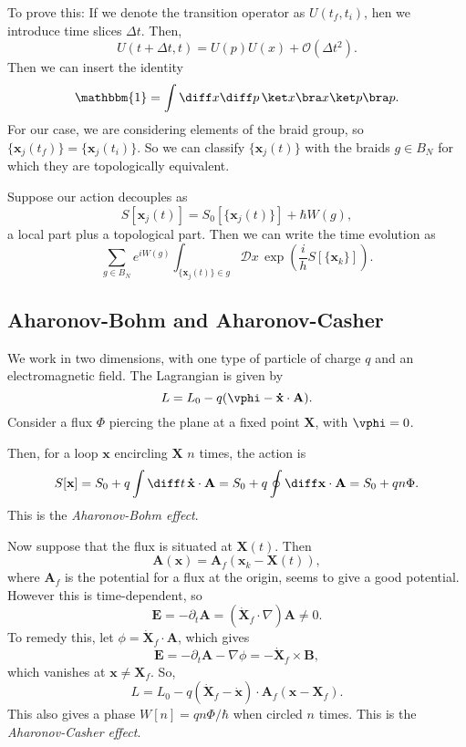 \documentclass[12pt]{article}
\begin{document}
To prove this: If we denote the transition operator as $U(t_f, t_i)$, hen we introduce time slices $\Delta t$. Then,
\[
U(t + \Delta t, t) = U(p)U(x) + \mathcal{O}(\Delta t^2).
\]
Then we can insert the identity
\[
\mathbbm{1} = \int \diff x \diff p \, \ket x \bra x \ket p \bra p.
\]
For our case, we are considering elements of the braid group, so $\{\mathbf{x}_j(t_f)\} = \{\mathbf{x}_j(t_i)\}$. So we can classify $\{\mathbf{x}_j(t)\}$ with the braids $g \in B_N$ for which they are topologically equivalent.

Suppose our action decouples as
\[
	S[\mathbf{x}_j(t)] = S_0[\{\mathbf{x}_j(t)\}] + \hbar W(g),
\]
a local part plus a topological part. Then we can write the time evolution as
\[
	\sum_{g \in B_N} e^{i W(g)} \int_{\{\mathbf{x}_j(t)\} \in g} \mathcal{D} x \, \exp \left( \frac ih S[\{\mathbf{x}_k\}] \right).
\]
\subsection{Aharonov-Bohm and Aharonov-Casher}%
\label{sub:acab}

We work in two dimensions, with one type of particle of charge $q$ and an electromagnetic field. The Lagrangian is given by
\[
L = L_0 - q(\vphi - \mathbf{\dot x} \cdot \mathbf{A}).
\]
Consider a flux $\Phi$ piercing the plane at a fixed point $\mathbf{X}$, with $\vphi = 0$.

Then, for a loop $\mathbf{x}$ encircling $\mathbf{X}$ $n$ times, the action is
\[
	S[\mathbf{x}] = S_0 + q \int \diff t\, \mathbf{\dot x} \cdot \mathbf{A} = S_0 + q \oint \diff \mathbf{x} \cdot \mathbf{A} = S_0 + q n \Phi.
\]
This is the \emph{Aharonov-Bohm effect}.

Now suppose that the flux is situated at $\mathbf{X}(t)$. Then
\[
\mathbf{A}(\mathbf{x}) = \mathbf{A}_f(\mathbf{x}_k - \mathbf{X}(t)),
\]
where $\mathbf{A}_f$ is the potential for a flux at the origin, seems to give a good potential. However this is time-dependent, so
\[
\mathbf{E} = - \partial_t \mathbf{A} = (\mathbf{\dot X}_f \cdot \nabla)\mathbf{A} \neq 0.
\]
To remedy this, let $\phi = \mathbf{\dot X}_f \cdot \mathbf{A}$, which gives
\[
\mathbf{E} = - \partial_t \mathbf{A} - \nabla \phi = - \mathbf{\dot X}_f \times \mathbf{B},
\]
which vanishes at $\mathbf{x} \neq \mathbf{X}_f$. So,
\[
L = L_0 - q (\mathbf{\dot X}_f - \mathbf{\dot x}) \cdot \mathbf{A}_f(\mathbf{x} - \mathbf{X}_f).
\]
This also gives a phase $W[n] = q n \Phi/\hbar$ when circled $n$ times. This is the \emph{Aharonov-Casher effect}.
\end{document}
